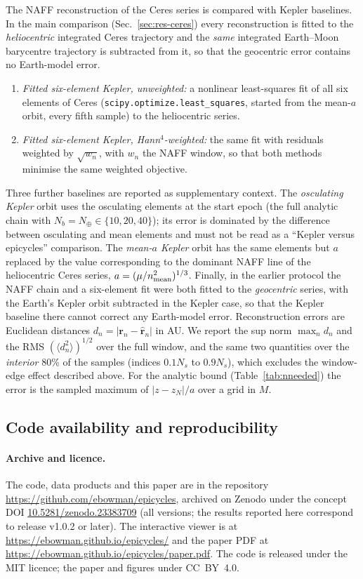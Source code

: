 The NAFF reconstruction of the Ceres series is compared with Kepler
baselines. In the main comparison (Sec.~\ref{sec:res-ceres}) every reconstruction
is fitted to the \emph{heliocentric} integrated Ceres trajectory and the
\emph{same} integrated Earth--Moon barycentre trajectory is subtracted from it, so
that the geocentric error contains no Earth-model error.
\begin{enumerate}
\item \emph{Fitted six-element Kepler, unweighted:} a nonlinear least-squares fit of all six
elements of Ceres (\texttt{scipy.optimize.least\_squares}, started from the
mean-$a$ orbit, every fifth sample) to the heliocentric series.
\item \emph{Fitted six-element Kepler, Hann$^4$-weighted:} the same fit with residuals
weighted by $\sqrt{w_n}$, with $w_n$ the NAFF window, so that both methods
minimise the same weighted objective.
\end{enumerate}
Three further baselines are reported as supplementary context. The \emph{osculating Kepler}
orbit uses the osculating elements at the start epoch (the full analytic chain with
$N_b=N_\oplus\in\{10,20,40\}$); its error is dominated by the difference
between osculating and mean elements and must not be read as a ``Kepler versus
epicycles'' comparison. The \emph{mean-$a$ Kepler} orbit has the same elements but
$a$ replaced by the value corresponding to the dominant NAFF line of the
heliocentric Ceres series, $a=(\mu/n_{\rm mean}^2)^{1/3}$. Finally, in the earlier
protocol the NAFF chain and a six-element fit were both fitted to the
\emph{geocentric} series, with the Earth's Kepler orbit subtracted in the Kepler
case, so that the Kepler baseline there cannot correct any Earth-model error.
Reconstruction errors are Euclidean distances $d_n=|\mathbf r_n-\hat{\mathbf r}_n|$
in AU. We report the sup norm $\max_nd_n$ and the RMS $(\langle d_n^2\rangle)^{1/2}$
over the full window, and the same two quantities over the \emph{interior} 80\%
of the samples (indices $0.1N_s$ to $0.9N_s$), which excludes the window-edge
effect described above. For the analytic bound (Table~\ref{tab:nneeded}) the
error is the sampled maximum of $|z-z_N|/a$ over a grid in $M$.

\subsection{Code availability and reproducibility}
\label{sec:code}

\paragraph*{Archive and licence.}
The code, data products and this paper are in the repository
\url{https://github.com/ebowman/epicycles}, archived on Zenodo under the concept DOI
\href{https://doi.org/10.5281/zenodo.23383709}{10.5281/zenodo.23383709}
(all versions; the results reported here correspond to release v1.0.2 or later). The
interactive viewer is at \url{https://ebowman.github.io/epicycles/} and the
paper PDF at \url{https://ebowman.github.io/epicycles/paper.pdf}. The code is
released under the MIT licence; the paper and figures under CC~BY~4.0.

